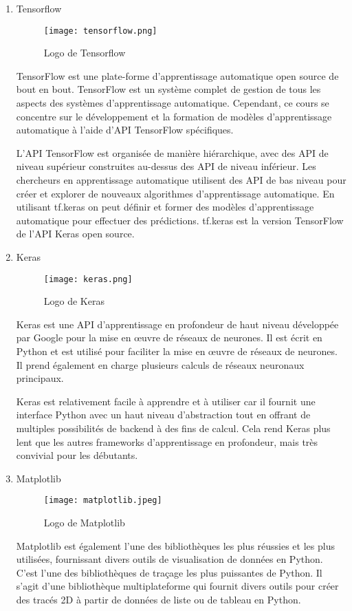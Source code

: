 \begin{enumerate}
        \bfseries
        \item Tensorflow
        \begin{figure}[H]
            \centering
            \texttt{[image: tensorflow.png]}
            \caption{Logo de Tensorflow}\label{fig:tensorflow}
        \end{figure}
        \normalfont
        TensorFlow est une plate-forme d'apprentissage automatique open source de bout en bout. TensorFlow est un système complet de gestion de tous les aspects des systèmes d'apprentissage automatique. Cependant, ce cours se concentre sur le développement et la formation de modèles d'apprentissage automatique à l'aide d'API TensorFlow spécifiques. 
        
        L'API TensorFlow est organisée de manière hiérarchique, avec des API de  niveau supérieur construites au-dessus des API de niveau inférieur. Les chercheurs en apprentissage automatique utilisent des API de bas niveau pour créer et explorer de nouveaux algorithmes d'apprentissage automatique. En utilisant tf.keras on peut définir et former des modèles d'apprentissage automatique  pour effectuer des prédictions. tf.keras est la version TensorFlow de l'API Keras open source.

        \bfseries
        \item Keras
        \begin{figure}[H]
            \centering
            \texttt{[image: keras.png]}
            \caption{Logo de Keras}\label{fig:keras}
        \end{figure}
        \normalfont
        Keras est une API d'apprentissage en profondeur de haut niveau développée par Google pour la mise en œuvre de réseaux de neurones. Il est écrit en Python et est utilisé pour faciliter la mise en œuvre de réseaux de neurones. Il prend également en charge plusieurs calculs de  réseaux neuronaux principaux. 
        
        Keras est relativement facile à apprendre et à utiliser car il fournit une interface Python avec un haut niveau d'abstraction tout en offrant de multiples possibilités de backend à des fins de calcul. Cela rend Keras plus lent que les autres frameworks d'apprentissage en profondeur, mais très convivial pour les débutants.

        \bfseries
        \item Matplotlib
        \begin{figure}[H]
            \centering
            \texttt{[image: matplotlib.jpeg]}
            \caption{Logo de Matplotlib}\label{fig:matplotlib}
        \end{figure}
        \normalfont
        Matplotlib est également l'une des bibliothèques les plus réussies et les plus utilisées, fournissant divers outils de visualisation de données en Python. 
        C'est l'une des bibliothèques de traçage les plus puissantes de Python. Il s'agit d'une bibliothèque multiplateforme qui fournit divers outils pour créer des tracés 2D à partir de données de liste ou de tableau en Python. 
        

\end{enumerate}
